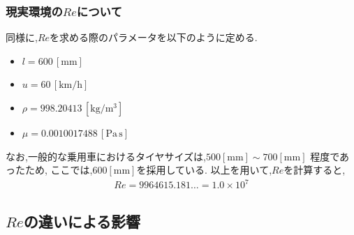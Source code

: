 \documentclass[twocolumn,a4j]{jsarticle}
\begin{document}
\subsubsection{現実環境の$Re$について}
同様に,$Re$を求める際のパラメータを以下のように定める.
\begin{itemize}
    \item $l = 600\,[\mathrm{mm}]$
    \item $u = 60\,[\mathrm{km/h}]$
    \item $\rho = 998.20413\,[\mathrm{kg/m^3}]$
    \item $\mu = 0.0010017488\,[\mathrm{Pa\,s}]$
\end{itemize}
なお,一般的な乗用車におけるタイヤサイズは,$500[\mathrm{mm}] \sim 700[\mathrm{mm}]$ 程度であったため,
ここでは,$600[\mathrm{mm}]$を採用している.
以上を用いて,$Re$を計算すると,
\begin{eqnarray}
    Re = 9964615.181\dots = 1.0 × 10^7
\end{eqnarray}
\subsection{$Re$の違いによる影響}
\end{document}
